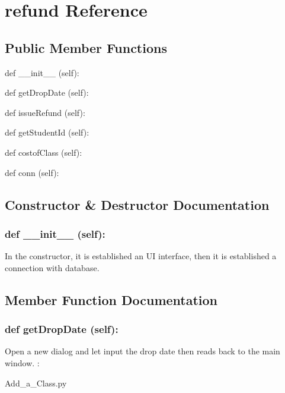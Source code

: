 \hypertarget{refund}{\section{refund Reference}
\label{refund}
}
\subsection*{Public Member Functions}
\begin{DoxyCompactItemize}
\item 
def {\_\_init\_\_} (self):
\item 
def {getDropDate} (self):
\item 
def {issueRefund} (self):
\item 
def {getStudentId} (self):
\item 
def {costofClass} (self):
\item 
def {conn} (self):
\end{DoxyCompactItemize}

\subsection{Constructor \& Destructor Documentation}
\hypertarget{class_poly_aa3def076b74bed67904976ad4f9fe9b1}{
\subsubsection[{def __init__ (self):}]{\setlength{\rightskip}{0pt plus 5cm}def {\_\_init\_\_} (self): 
}}
In the constructor, it is established an UI interface, then it is  established a connection with database.
 
\subsection{Member Function Documentation}
\hypertarget{class_poly_a14a7ad77ce612b0c54f531d307ee4b39}{
\subsubsection[{def getDropDate (self):}]{\setlength{\rightskip}{0pt plus 5cm}def {getDropDate} (self):}}\label{class_poly_a14a7ad77ce612b0c54f531d307ee4b39}
Open a new dialog and let input the drop date then reads back to the main window.
:\begin{DoxyCompactItemize}
\item 
Add\_a\_Class.\-py\end{DoxyCompactItemize}

